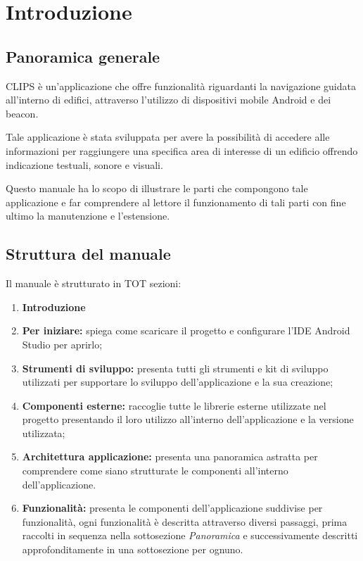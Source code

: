 \documentclass[../ManualeSviluppatore.tex]{subfiles}
\begin{document}
\section{Introduzione}
\label{sec:Introduzione}
	\subsection{Panoramica generale}
	
	CLIPS è un'applicazione che offre funzionalità riguardanti la navigazione guidata all'interno di edifici, attraverso l'utilizzo di dispositivi mobile Android e dei beacon.
	
	Tale applicazione è stata sviluppata per avere la possibilità di accedere alle informazioni per raggiungere una specifica area di interesse di un edificio offrendo indicazione testuali, sonore e visuali.
	
	Questo manuale ha lo scopo di illustrare le parti che compongono tale applicazione e far comprendere al lettore il funzionamento di tali parti con fine ultimo la manutenzione e l'estensione.
	
	\subsection{Struttura del manuale}
		Il manuale è strutturato in TOT sezioni:
		\begin{enumerate}
			\item \textbf{Introduzione}
			\item \textbf{Per iniziare:} spiega come scaricare il progetto e configurare l'IDE Android Studio per aprirlo;
			\item \textbf{Strumenti di sviluppo:} presenta tutti gli strumenti e kit di sviluppo utilizzati per supportare lo sviluppo dell'applicazione e la sua creazione;
			\item \textbf{Componenti esterne:} raccoglie tutte le librerie esterne utilizzate nel progetto presentando il loro utilizzo all'interno dell'applicazione e la versione utilizzata;
			\item \textbf{Architettura applicazione:} presenta una panoramica astratta per comprendere come siano strutturate le componenti all'interno dell'applicazione.
			\item \textbf{Funzionalità:} presenta le componenti dell'applicazione suddivise per funzionalità, ogni funzionalità è descritta attraverso diversi passaggi, prima raccolti in sequenza nella sottosezione \textit{Panoramica} e successivamente descritti approfonditamente in una sottosezione per ognuno.
			
		\end{enumerate}
	
\end{document}
